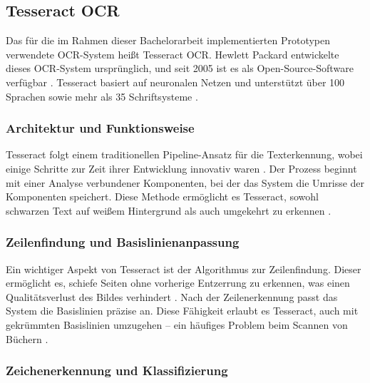 \subsection{Tesseract OCR}
\label{subsec:tesseract-ocr}

Das für die im Rahmen dieser Bachelorarbeit implementierten Prototypen verwendete \gls{OCR}-System heißt Tesseract \gls{OCR}. Hewlett Packard entwickelte dieses \gls{OCR}-System ursprünglich, und seit 2005 ist es als Open-Source-Software verfügbar \parencite{SmithR_2007_AOot}. Tesseract basiert auf neuronalen Netzen und unterstützt über 100 Sprachen sowie mehr als 35 Schriftsysteme \parencite{tesseract_ocr_user_manual}. 

\subsubsection{Architektur und Funktionsweise}
\label{subsubsec:architektur-und-funktionsweise}

Tesseract folgt einem traditionellen Pipeline-Ansatz für die Texterkennung, wobei einige Schritte zur Zeit ihrer Entwicklung innovativ waren \parencite{SmithR_2007_AOot}. Der Prozess beginnt mit einer Analyse verbundener Komponenten, bei der das System die Umrisse der Komponenten speichert. Diese Methode ermöglicht es Tesseract, sowohl schwarzen Text auf weißem Hintergrund als auch umgekehrt zu erkennen \parencite{SmithR_2007_AOot}.

\subsubsection{Zeilenfindung und Basislinienanpassung}
\label{subsubsec:zeilenfindung-und-basislinienanpassung}

Ein wichtiger Aspekt von Tesseract ist der Algorithmus zur Zeilenfindung. Dieser ermöglicht es, schiefe Seiten ohne vorherige Entzerrung zu erkennen, was einen Qualitätsverlust des Bildes verhindert \parencite{SmithR_2007_AOot}. Nach der Zeilenerkennung passt das System die Basislinien präzise an. Diese Fähigkeit erlaubt es Tesseract, auch mit gekrümmten Basislinien umzugehen – ein häufiges Problem beim Scannen von Büchern \parencite{SmithR_2007_AOot}.

\subsubsection{Zeichenerkennung und Klassifizierung}
\label{subsubsec:zeichenerkennung-und-klassifizierung}

